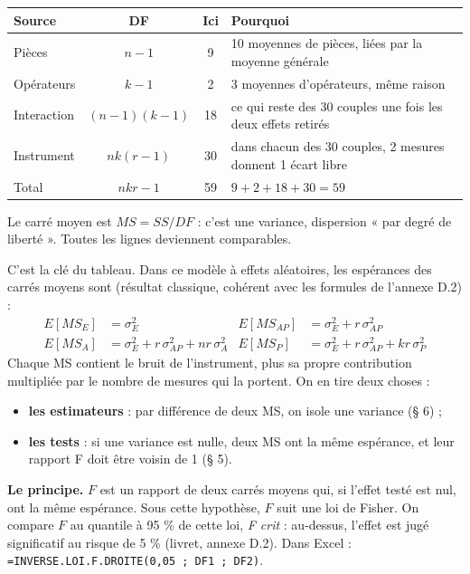 \documentclass[10pt,a4paper]{article}
\begin{document}
\renewcommand{\arraystretch}{1.2}
\begin{tabularx}{\linewidth}{@{}l c c X@{}}
\toprule
\textbf{Source} & \textbf{DF} & \textbf{Ici} & \textbf{Pourquoi}\\\midrule
Pièces & $n-1$ & 9 & 10 moyennes de pièces, liées par la moyenne générale\\
Opérateurs & $k-1$ & 2 & 3 moyennes d'opérateurs, même raison\\
Interaction & $(n-1)(k-1)$ & 18 & ce qui reste des 30 couples une fois les deux effets retirés\\
Instrument & $nk(r-1)$ & 30 & dans chacun des 30 couples, 2 mesures donnent 1 écart libre\\
Total & $nkr-1$ & 59 & $9+2+18+30=59$\\
\bottomrule
\end{tabularx}
Le carré moyen est $MS = SS/DF$ : c'est une variance, dispersion « par degré de liberté ». Toutes les lignes deviennent comparables.

C'est la clé du tableau. Dans ce modèle à effets aléatoires, les espérances des carrés moyens sont (résultat classique, cohérent avec les formules de l'annexe D.2) :
\begin{align*}
E[MS_E]&=\sigma_E^2 & E[MS_{AP}]&=\sigma_E^2+r\,\sigma_{AP}^2\\
E[MS_A]&=\sigma_E^2+r\,\sigma_{AP}^2+nr\,\sigma_A^2 & E[MS_P]&=\sigma_E^2+r\,\sigma_{AP}^2+kr\,\sigma_P^2
\end{align*}
Chaque MS contient le bruit de l'instrument, plus sa propre contribution multipliée par le nombre de mesures qui la portent. On en tire deux choses :
\begin{itemize}
\item \textbf{les estimateurs} : par différence de deux MS, on isole une variance (§ 6) ;
\item \textbf{les tests} : si une variance est nulle, deux MS ont la même espérance, et leur rapport F doit être voisin de 1 (§ 5).
\end{itemize}

\textbf{Le principe.} $F$ est un rapport de deux carrés moyens qui, si l'effet testé est nul, ont la même espérance. Sous cette hypothèse, $F$ suit une loi de Fisher. On compare $F$ au quantile à 95 \% de cette loi, \emph{F crit} : au-dessus, l'effet est jugé significatif au risque de 5 \% (livret, annexe D.2). Dans Excel : \texttt{=INVERSE.LOI.F.DROITE(0,05 ; DF1 ; DF2)}.
\end{document}
